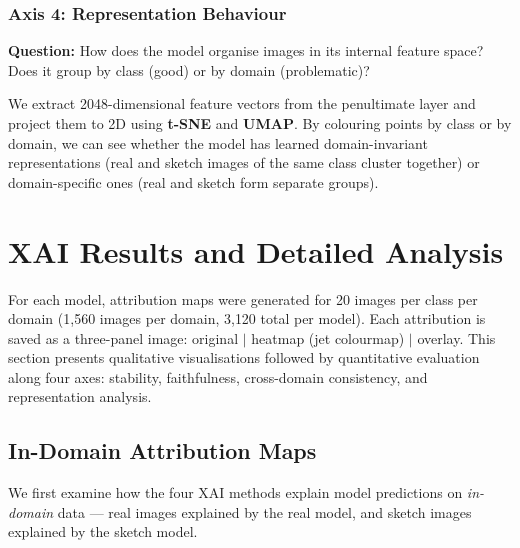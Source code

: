 \documentclass[12pt, a4paper]{article}
\begin{document}
\subsubsection{Axis 4: Representation Behaviour}

\textbf{Question:} How does the model organise images in its internal feature
space?  Does it group by class (good) or by domain (problematic)?

We extract 2048-dimensional feature vectors from the penultimate layer and
project them to 2D using \textbf{t-SNE} and \textbf{UMAP}.  By colouring
points by class or by domain, we can see whether the model has learned
domain-invariant representations (real and sketch images of the same class
cluster together) or domain-specific ones (real and sketch form separate
groups).


\section{XAI Results and Detailed Analysis}
\label{sec:xai_results}

For each model, attribution maps were generated for 20 images per class per
domain (1{,}560 images per domain, 3{,}120 total per model).  Each attribution
is saved as a three-panel image: original $|$ heatmap (jet colourmap) $|$
overlay.  This section presents qualitative visualisations followed by
quantitative evaluation along four axes: stability, faithfulness,
cross-domain consistency, and representation analysis.

\subsection{In-Domain Attribution Maps}
\label{sec:in_domain_attr}

We first examine how the four XAI methods explain model predictions on
\emph{in-domain} data --- real images explained by the real model, and
sketch images explained by the sketch model.
\end{document}

